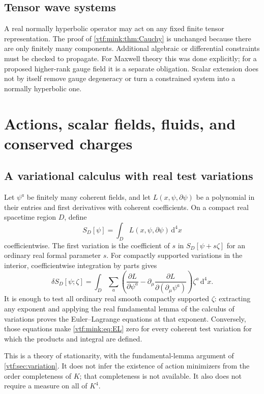 \documentclass[11pt,letterpaper]{article}
\theoremstyle{definition}
\theoremstyle{remark}
\newcommand{\dd}{\mathrm d}
\begin{document}
\subsection{Tensor wave systems}
A real normally hyperbolic operator may act on any fixed finite tensor representation. The proof of \cref{vtf:mink:thm:Cauchy} is unchanged because there are only finitely many components. Additional algebraic or differential constraints must be checked to propagate. For Maxwell theory this was done explicitly; for a proposed higher-rank gauge field it is a separate obligation. Scalar extension does not by itself remove gauge degeneracy or turn a constrained system into a normally hyperbolic one.

\section{Actions, scalar fields, fluids, and conserved charges}\label{vtf:mink:sec:actions}

\subsection{A variational calculus with real test variations}
Let $\psi^a$ be finitely many coherent fields, and let
$L(x,\psi,\partial\psi)$ be a polynomial in their entries and first derivatives with coherent coefficients. On a compact real spacetime region $D$, define
\begin{equation}
 S_D[\psi]=\int_D L(x,\psi,\partial\psi)\,\dd^4x
\end{equation}
coefficientwise. The first variation is the coefficient of $s$ in $S_D[\psi+s\zeta]$ for an ordinary real formal parameter $s$. For compactly supported variations in the interior, coefficientwise integration by parts gives
\begin{equation}\label{vtf:mink:eq:EL}
 \delta S_D[\psi;\zeta]
 =\int_D\sum_a
 \left(\frac{\partial L}{\partial\psi^a}
 -\partial_\mu\frac{\partial L}{\partial(\partial_\mu\psi^a)}\right)
 \zeta^a\,\dd^4x.
\end{equation}
It is enough to test all ordinary real smooth compactly supported $\zeta$: extracting any exponent and applying the real fundamental lemma of the calculus of variations proves the Euler--Lagrange equations at that exponent. Conversely, those equations make \cref{vtf:mink:eq:EL} zero for every coherent test variation for which the products and integral are defined.

This is a theory of stationarity, with the fundamental-lemma argument of
\cref{vtf:sec:variation}. It does not infer the existence of action minimizers from the order completeness of $K$; that completeness is not available. It also does not require a measure on all of $K^4$.
\end{document}
